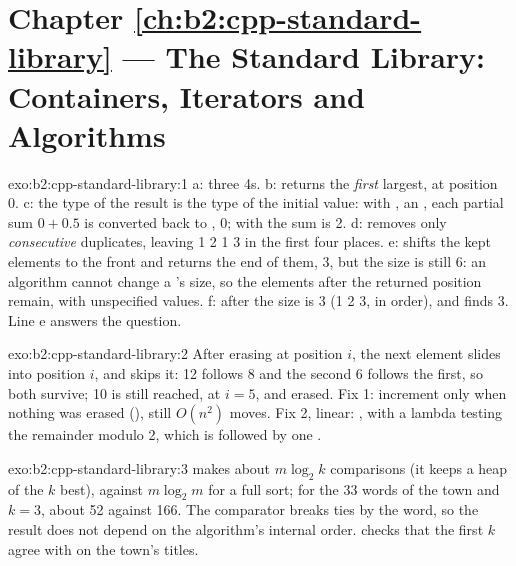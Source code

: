 \section*{Chapter \ref{ch:b2:cpp-standard-library} --- The Standard Library: Containers, Iterators and Algorithms}

\begin{solution}{exo:b2:cpp-standard-library:1}
a: three 4s. b:  returns the \emph{first} largest, at position 0. c: the type of the result is the
type of the initial value: with , an , each partial sum $0 + 0.5$ is converted back to
, 0; with  the sum is 2. d:  removes only \emph{consecutive} duplicates, leaving
1 2 1 3 in the first four places. e:  shifts the kept elements to the front and returns the end of
them, 3, but the size is still 6: an algorithm cannot change a 's size, so the elements after the
returned position remain, with unspecified values. f: after  the size is 3 (1 2 3, in order), and
 finds 3. Line e answers the question.
\end{solution}

\begin{solution}{exo:b2:cpp-standard-library:2}
After erasing at position $i$, the next element slides into position $i$, and  skips it: 12 follows 8
and the second 6 follows the first, so both survive; 10 is still reached, at $i = 5$, and erased. Fix 1: increment
 only when nothing was erased (), still $O(n^2)$ moves. Fix 2, linear:
, with  a lambda testing the remainder modulo 2, which is  followed by one .
\end{solution}

\begin{solution}{exo:b2:cpp-standard-library:3}
 makes about $m \log_2 k$ comparisons (it keeps a heap of the $k$ best), against $m \log_2 m$ for a
full sort; for the 33 words of the town and $k = 3$, about 52 against 166. The comparator breaks ties by the word,
so the result does not depend on the algorithm's internal order.  checks that the
first $k$ agree with  on the town's titles.
\end{solution}


